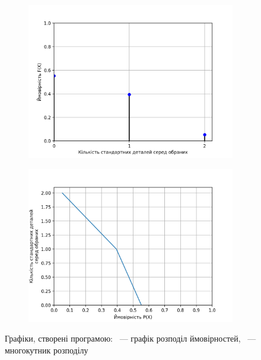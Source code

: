 \documentclass[
	a4paper,
	oneside,
	BCOR = 10mm,
	DIV = 12,
	12pt,
	headings = normal,
]{scrartcl}
\begin{document}
		\begin{figure}[!htbp]
			\centering
			\begin{subfigure}[t]{0.5\columnwidth}
				\centering
				\includegraphics[width = \columnwidth]{./assets/y03s02-imitmod-lab-03-p01.png}
				\caption{}
				\label{subfig:pmf}
			\end{subfigure}%
			\begin{subfigure}[t]{0.5\columnwidth}
				\centering
				\includegraphics[width = \columnwidth]{./assets/y03s02-imitmod-lab-03-p02.png}
				\caption{}
				\label{subfig:dist-polygon}
			\end{subfigure}
			\caption{Графіки, створені програмою: ~— графік розподіл ймовірностей, ~— многокутник розподілу}
			\label{fig:plots}
		\end{figure}
\end{document}
